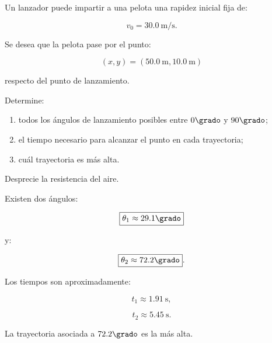 \nivelavanzado


\begin{ejercicio}
Un lanzador puede impartir a una pelota una rapidez inicial fija de:

\[
v_0=\SI{30.0}{\meter\per\second}.
\]

Se desea que la pelota pase por el punto:

\[
(x,y)
=
(\SI{50.0}{\meter},\SI{10.0}{\meter})
\]

respecto del punto de lanzamiento.

Determine:

\begin{enumerate}[label=\alph*)]
    \item todos los ángulos de lanzamiento posibles entre \(0\grado\) y
    \(90\grado\);
    \item el tiempo necesario para alcanzar el punto en cada trayectoria;
    \item cuál trayectoria es más alta.
\end{enumerate}

Desprecie la resistencia del aire.
\end{ejercicio}

\begin{respuesta}
Existen dos ángulos:

\[
\boxed{
\theta_1\approx29.1\grado
}
\]

y:

\[
\boxed{
\theta_2\approx72.2\grado
}.
\]

Los tiempos son aproximadamente:

\[
t_1\approx\SI{1.91}{\second},
\]

\[
t_2\approx\SI{5.45}{\second}.
\]

La trayectoria asociada a \(72.2\grado\) es la más alta.
\end{respuesta}

